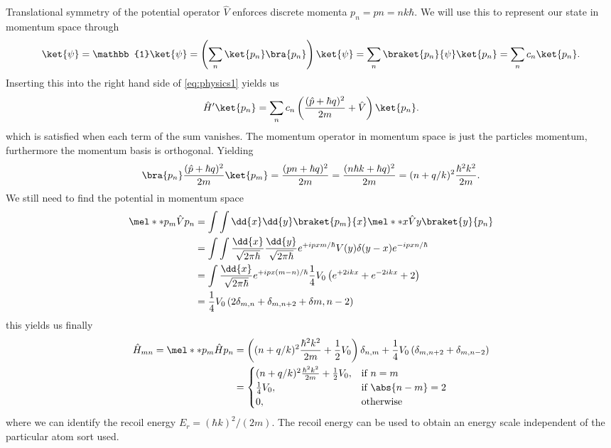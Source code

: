 Translational symmetry of the potential operator $\hat{V}$ enforces discrete
momenta $p_n=pn=nk\hbar$. We will use this to represent our state in momentum
space through
\begin{equation}
  \ket{\psi}
  =\mathbb{1}\ket{\psi}
  =\left(\sum_n\ket{p_n}\bra{p_n}\right)\ket{\psi}
  =\sum_n\braket{p_n}{\psi}\ket{p_n}
  =\sum_nc_n\ket{p_n}
  \label{eq:physics:psimom}.
\end{equation}
Inserting this into the right hand side of \cref{eq:physics1} yields us
\begin{equation}
  \hat{H}^\prime\ket{p_n}
  =\sum_nc_n\left(\frac{(\hat{p}+\hbar q)^2}{2m}+\hat{V}\right)\ket{p_n}
  \label{eq:physics2}.
\end{equation}
which is satisfied when each term of the sum vanishes. The momentum operator
in momentum space is just the particles momentum, furthermore the
momentum basis is orthogonal. Yielding
\begin{equation}
  \bra{p_n}\frac{(\hat{p}+\hbar q)^2}{2m}\ket{p_m}
  =
  \frac{(pn+\hbar q)^2}{2m}
  =
  \frac{(n\hbar k+\hbar q)^2}{2m}
  =
  (n+q/k)^2\frac{\hbar^2k^2}{2m}
  .
\end{equation}
We still need to find the potential in momentum space
\begin{align*}
  \mel**{p_m}{\hat{V}}{p_n}
  &=
  \int\int\dd{x}\dd{y}\braket{p_m}{x}\mel**{x}{\hat{V}}{y}\braket{y}{p_n}\\
  &=
  \int\int\frac{\dd{x}}{\sqrt{2\pi\hbar}}\frac{\dd{y}}{\sqrt{2\pi\hbar}}
  e^{+ipxm/\hbar}V(y)\delta(y-x)e^{-ipxn/\hbar}\\
  &=
  \int\frac{\dd{x}}{\sqrt{2\pi\hbar}}
  e^{+ipx(m-n)/\hbar}\frac{1}{4}V_0\left(e^{+2ikx}+e^{-2ikx}+2\right)\\
  &=
  \frac{1}{4}V_0\left(2\delta_{m,n}+\delta_{m,n+2}+\delta{m,n-2}\right)
\end{align*}
this yields us finally
\begin{align*}
  \hat{H}_{mn}
  =
  \mel**{p_m}{\hat{H}}{p_n}
  &=
  \left((n+q/k)^2\frac{\hbar^2k^2}{2m}+\frac{1}{2}V_0\right)\delta_{n,m}
  +\frac{1}{4}V_0\left(\delta_{m,n+2}+\delta_{m,n-2}\right)\\
  &=
  \begin{cases}
    (n+q/k)^2\frac{\hbar^2k^2}{2m}+\frac{1}{2}V_0, & \text{if } n=m\\
    \frac{1}{4}V_0, & \text{if } \abs{n-m}=2\\
    0, & \text{otherwise}
  \end{cases}
\end{align*}
where we can identify the recoil energy $E_r=(\hbar k)^2/(2m)$. The recoil
energy can be used to obtain an energy scale independent of the particular
atom sort used.
